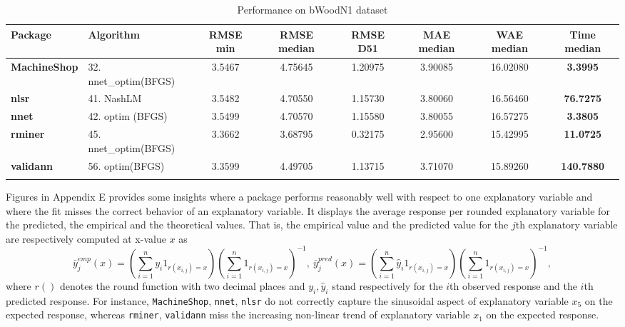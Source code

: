 \begin{Schunk}
\begin{table}

\caption{\label{tab:unnamed-chunk-5}Performance on bWoodN1 dataset}
\centering
\fontsize{7}{9}\selectfont
\begin{tabular}[t]{>{\bfseries}llccccc>{\bfseries}c}
\toprule
Package & Algorithm & RMSE min & RMSE median & RMSE D51 & MAE median & WAE median & Time median\\
\midrule
MachineShop & 32. nnet\_optim(BFGS) & 3.5467 & 4.75645 & 1.20975 & 3.90085 & 16.02080 & 3.3995\\
nlsr & 41. NashLM & 3.5482 & 4.70550 & 1.15730 & 3.80060 & 16.56460 & 76.7275\\
nnet & 42. optim (BFGS) & 3.5499 & 4.70570 & 1.15580 & 3.80055 & 16.57275 & 3.3805\\
rminer & 45. nnet\_optim(BFGS) & 3.3662 & 3.68795 & 0.32175 & 2.95600 & 15.42995 & 11.0725\\
validann & 56. optim(BFGS) & 3.3599 & 4.49705 & 1.13715 & 3.71070 & 15.89260 & 140.7880\\
\bottomrule
\multicolumn{8}{l}{\textit{Note: } statistics taken over 20 runs; time in seconds.}\\
\end{tabular}
\end{table}

\end{Schunk}

Figures in Appendix E provides some insights where a package performs
reasonably well with respect to one explanatory variable and where the
fit misses the correct behavior of an explanatory variable. It displays
the average response per rounded explanatory variable for the predicted,
the empirical and the theoretical values. That is, the empirical value
and the predicted value for the \(j\)th explanatory variable are
respectively computed at x-value \(x\) as \[
\bar y^{emp}_j(x) =  \left(\sum_{i=1}^n y_i 1_{r(x_{i,j}) = x} \right)
\left(\sum_{i=1}^n 1_{r(x_{i,j}) = x}\right)^{-1},~
\bar y^{pred}_j(x) = \left(\sum_{i=1}^n \hat y_i 1_{r(x_{i,j}) = x} \right) 
\left(\sum_{i=1}^n 1_{r(x_{i,j}) = x}\right)^{-1} ,
\] where \(r()\) denotes the round function with two decimal places and
\(y_i, \hat y_i\) stand respectively for the \(i\)th observed response
and the \(i\)th predicted response. For instance, \texttt{MachineShop},
\texttt{nnet}, \texttt{nlsr} do not correctly capture the sinusoidal
aspect of explanatory variable \(x_5\) on the expected response, whereas
\texttt{rminer}, \texttt{validann} miss the increasing non-linear trend
of explanatory variable \(x_1\) on the expected response.

